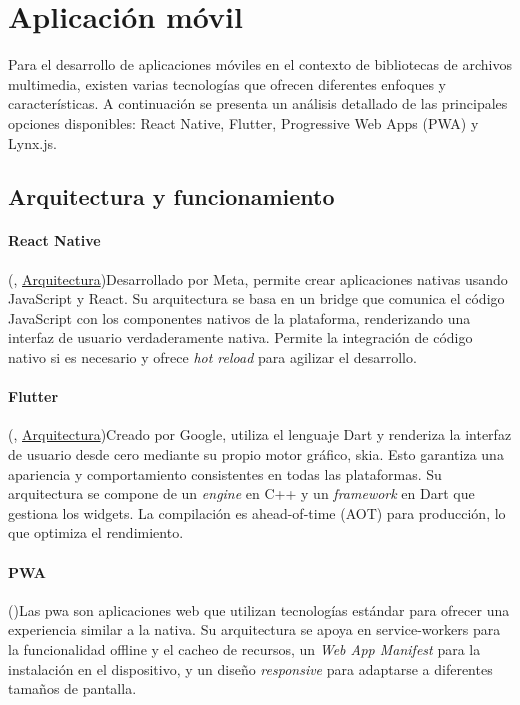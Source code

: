 \section{Aplicación móvil}

Para el desarrollo de aplicaciones móviles en el contexto de bibliotecas de archivos multimedia, existen varias tecnologías que ofrecen diferentes enfoques y características. A continuación se presenta un análisis detallado de las principales opciones disponibles: React Native, Flutter, Progressive Web Apps (PWA) y Lynx.js.

\subsection{Arquitectura y funcionamiento}

\paragraph{React Native}
(\cite{react-native-documentation}, \href{https://reactnative.dev/architecture/overview}{Arquitectura})Desarrollado por Meta, permite crear aplicaciones nativas usando JavaScript y React. Su arquitectura se basa en un \gls{bridge} que comunica el código JavaScript con los componentes nativos de la plataforma, renderizando una interfaz de usuario verdaderamente nativa. Permite la integración de código nativo si es necesario y ofrece \textit{hot reload} para agilizar el desarrollo.

\paragraph{Flutter}
(\cite{flutter-documentation}, \href{https://docs.flutter.dev/resources/architectural-overview}{Arquitectura})Creado por Google, utiliza el lenguaje Dart y renderiza la interfaz de usuario desde cero mediante su propio motor gráfico, \gls{skia}. Esto garantiza una apariencia y comportamiento consistentes en todas las plataformas. Su arquitectura se compone de un \textit{engine} en C++ y un \textit{framework} en Dart que gestiona los widgets. La compilación es \gls{ahead-of-time} (AOT) para producción, lo que optimiza el rendimiento.

\paragraph{PWA}
(\cite{pwa-documentation})Las \acrfull{pwa} son aplicaciones web que utilizan tecnologías estándar para ofrecer una experiencia similar a la nativa. Su arquitectura se apoya en \glspl{service-worker} para la funcionalidad offline y el cacheo de recursos, un \textit{Web App Manifest} para la instalación en el dispositivo, y un diseño \textit{responsive} para adaptarse a diferentes tamaños de pantalla.

